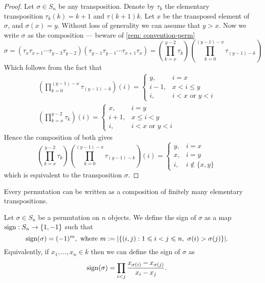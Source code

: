 \begin{proof}
Let \(\sigma \in S_n\) be any transposition. Denote by \(\tau_k\) the
elementary transposition \(\tau_k(k) = k + 1\) and \(\tau(k + 1) k\). Let
\(x\) be the transposed element of \(\sigma\), and \(\sigma(x) = y\). Without
loss of generality we can assume that \(y > x\). Now we write \(\sigma\) as
the composition --- beware of \cref{rem: convention-perm}
\[
  \sigma = \left(\tau_x \tau_{x + 1} \cdots \tau_{y - 3} \tau_{y - 2} \right)
  \left( \tau_{y - 1} \tau_{y - 1} \cdots \tau_{x + 1} \tau_{x} \right)
  = \left( \prod_{k = x}^{y-2} \tau_k \right)
  \left( \prod_{k = 0}^{(y - 1) - x} \tau_{(y-1) - k} \right)
\]
Which follows from the fact that
\begin{gather*}
  \left( \prod_{k = 0}^{(y - 1) - x} \tau_{(y-1) - k} \right)(i) =
  \begin{cases}
    y, &i = x \\
    i - 1, &x < i \leq y \\
    i, &i < x \text{ or } y < i
  \end{cases}
  \\
  \left( \prod_{k = x}^{y-2} \tau_k \right)(i) =
  \begin{cases}
    x, &i = y \\
    i + 1, &x \leq i < y \\
    i, &i < x \text{ or } y < i
  \end{cases}
\end{gather*}
Hence the composition of both gives
\[
  \left( \prod_{k = x}^{y-2} \tau_k \right)
  \left( \prod_{k = 0}^{(y - 1) - x} \tau_{(y-1) - k} \right)(i) =
  \begin{cases}
    y, &i = x \\
    x, &i = y \\
    i, &i \not\in \{x, y\}
  \end{cases}
\]
which is equivalent to the transposition \(\sigma\).
\end{proof}

\begin{corollary}
Every permutation can be written as a composition of finitely many elementary
transpositions.
\end{corollary}

\begin{definition}[Sign]
\label{def: sign}
Let \(\sigma \in S_n\) be a permutation on \(n\) objects. We define
the sign of \(\sigma\) as a map \(\operatorname{sign}: S_n \to
\{1, -1\}\) such that
\[
  \operatorname{sign}(\sigma) = (-1)^m, \text{ where }
  m := |\{(i, j) : 1 \leqslant i < j \leqslant n,\ \sigma(i) > \sigma(j)\}|.
\]
Equivalently, if \(x_1, \dots, x_n \in k\) then we can define the
sign of \(\sigma\) as
\[
  \operatorname{sign}(\sigma) = \prod_{i < j} \frac{x_{\sigma(i)} -
  x_{\sigma(j)}}{x_i - x_j}.
\]
\end{definition}

